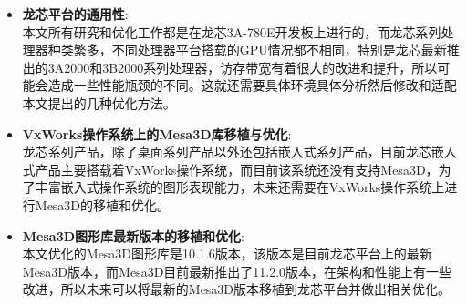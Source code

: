 \begin{itemize}
\item{\textbf{龙芯平台的通用性}}: \\
本文所有研究和优化工作都是在龙芯3A-780E开发板上进行的，而龙芯系列处理器种类繁多，不同处理器平台搭载的GPU情况都不相同，特别是龙芯最新推出的3A2000和3B2000系列处理器，访存带宽有着很大的改进和提升，所以可能会造成一些性能瓶颈的不同。这就还需要具体环境具体分析然后修改和适配本文提出的几种优化方法。

\item{\textbf{VxWorks操作系统上的Mesa3D库移植与优化}}: \\
龙芯系列产品，除了桌面系列产品以外还包括嵌入式系列产品，目前龙芯嵌入式产品主要搭载着VxWorks操作系统，而目前该系统还没有支持Mesa3D，为了丰富嵌入式操作系统的图形表现能力，未来还需要在VxWorks操作系统上进行Mesa3D的移植和优化。

\item{\textbf{Mesa3D图形库最新版本的移植和优化}}: \\
本文优化的Mesa3D图形库是10.1.6版本，该版本是目前龙芯平台上的最新Mesa3D版本，而Mesa3D目前最新推出了11.2.0版本，在架构和性能上有一些改进，所以未来可以将最新的Mesa3D版本移植到龙芯平台并做出相关优化。

\end{itemize}


